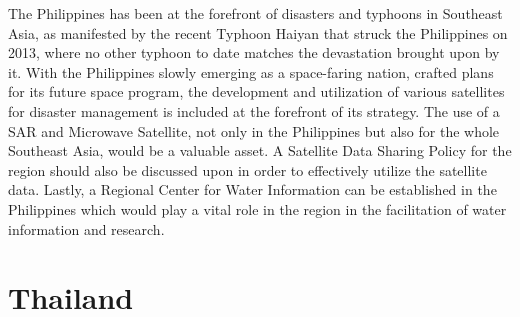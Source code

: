 {\vspace{0.4 cm}
  
The Philippines has been at the forefront of disasters and typhoons in Southeast Asia, as manifested by the recent Typhoon Haiyan that struck the Philippines on 2013, where no other typhoon to date matches the devastation brought upon by it. With the Philippines slowly emerging as a space-faring nation, crafted plans for its future space program, the development and utilization of various satellites for disaster management is included at the forefront of its strategy. The use of a SAR and Microwave Satellite, not only in the Philippines but also for the whole Southeast Asia, would be a valuable asset. A Satellite Data Sharing Policy for the region should also be discussed upon in order to effectively utilize the satellite data. Lastly, a Regional Center for Water Information can be established in the Philippines which would play a vital role in the region in the facilitation of water information and research. 
\par}

\section{Thailand}

\vspace{0.5 cm}

